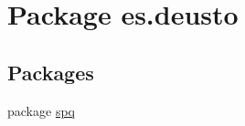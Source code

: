 \hypertarget{namespacees_1_1deusto}{}\section{Package es.\+deusto}
\label{namespacees_1_1deusto}
\subsection*{Packages}
\begin{DoxyCompactItemize}
\item 
package \hyperlink{namespacees_1_1deusto_1_1spq}{spq}
\end{DoxyCompactItemize}
